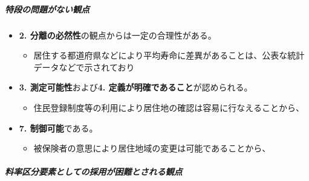 \documentclass[report,gutter=10mm,fore-edge=10mm,uplatex,dvipdfmx]{jlreq}
\begin{document}
\subparagraph{特段の問題がない観点}
\begin{itemize}
\tightlist
\item
  \textbf{2. 分離の必然性}の観点からは一定の合理性がある。

  \begin{itemize}
  \tightlist
  \item
    居住する都道府県などにより平均寿命に差異があることは、公表な統計データなどで示されており
  \end{itemize}
\item
  \textbf{3. 測定可能性}および\textbf{4.
  定義が明確であること}が認められる。

  \begin{itemize}
  \tightlist
  \item
    住民登録制度等の利用により居住地の確認は容易に行なえることから、
  \end{itemize}
\item
  \textbf{7. 制御可能}である。

  \begin{itemize}
  \tightlist
  \item
    被保険者の意思により居住地域の変更は可能であることから、
  \end{itemize}
\end{itemize}

\subparagraph{料率区分要素としての採用が困難とされる観点}
\end{document}
